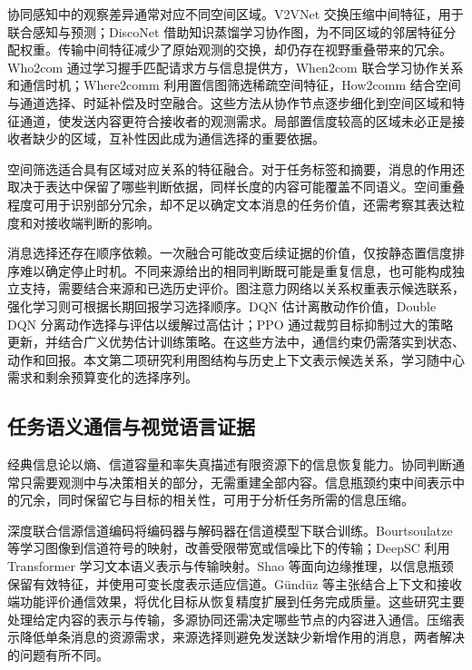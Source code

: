 协同感知中的观察差异通常对应不同空间区域。V2VNet 交换压缩中间特征，用于联合感知与预测\cite{v2vnet}；DiscoNet 借助知识蒸馏学习协作图，为不同区域的邻居特征分配权重\cite{disconet}。传输中间特征减少了原始观测的交换，却仍存在视野重叠带来的冗余。Who2com 通过学习握手匹配请求方与信息提供方\cite{who2com}，When2com 联合学习协作关系和通信时机\cite{when2com}；Where2comm 利用置信图筛选稀疏空间特征\cite{where2comm}，How2comm 结合空间与通道选择、时延补偿及时空融合\cite{how2comm}。这些方法从协作节点逐步细化到空间区域和特征通道，使发送内容更符合接收者的观测需求。局部置信度较高的区域未必正是接收者缺少的区域，互补性因此成为通信选择的重要依据。

空间筛选适合具有区域对应关系的特征融合。对于任务标签和摘要，消息的作用还取决于表达中保留了哪些判断依据，同样长度的内容可能覆盖不同语义。空间重叠程度可用于识别部分冗余，却不足以确定文本消息的任务价值，还需考察其表达粒度和对接收端判断的影响。

消息选择还存在顺序依赖。一次融合可能改变后续证据的价值，仅按静态置信度排序难以确定停止时机。不同来源给出的相同判断既可能是重复信息，也可能构成独立支持，需要结合来源和已选历史评价。图注意力网络以关系权重表示候选联系\cite{gat}，强化学习则可根据长期回报学习选择顺序\cite{sutton2018rl}。DQN 估计离散动作价值，Double DQN 分离动作选择与评估以缓解过高估计\cite{mnih2015dqn,vanhasselt2016double}；PPO 通过裁剪目标抑制过大的策略更新，并结合广义优势估计训练策略\cite{ppo,gae}。在这些方法中，通信约束仍需落实到状态、动作和回报。本文第二项研究利用图结构与历史上下文表示候选关系，学习随中心需求和剩余预算变化的选择序列。

\subsection{任务语义通信与视觉语言证据}

经典信息论以熵、信道容量和率失真描述有限资源下的信息恢复能力\cite{shannon1948,cover2006information}。协同判断通常只需要观测中与决策相关的部分，无需重建全部内容。信息瓶颈约束中间表示中的冗余，同时保留它与目标的相关性，可用于分析任务所需的信息压缩\cite{tishby2000ib}。

深度联合信源信道编码将编码器与解码器在信道模型下联合训练。Bourtsoulatze 等学习图像到信道符号的映射，改善受限带宽或信噪比下的传输\cite{bourtsoulatze2019deepjscc}；DeepSC 利用 Transformer 学习文本语义表示与传输映射\cite{xie2021deepsc,vaswani2017attention}。Shao 等面向边缘推理，以信息瓶颈保留有效特征，并使用可变长度表示适应信道\cite{shao2021task}。G\"und\"uz 等主张结合上下文和接收端功能评价通信效果，将优化目标从恢复精度扩展到任务完成质量\cite{semantic-communications-jsac}。这些研究主要处理给定内容的表示与传输，多源协同还需决定哪些节点的内容进入通信。压缩表示降低单条消息的资源需求，来源选择则避免发送缺少新增作用的消息，两者解决的问题有所不同。

